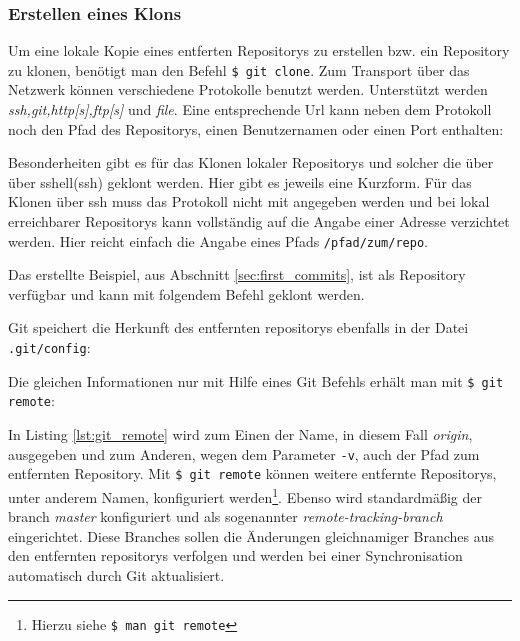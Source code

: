 \subsubsection{Erstellen eines Klons}\label{sec:gitclone}
Um eine lokale Kopie eines entferten Repositorys zu erstellen bzw. ein
Repository zu klonen, benötigt man den Befehl \texttt{\$ git clone}. Zum
Transport über das Netzwerk können verschiedene Protokolle benutzt werden.
Unterstützt werden \textit{ssh,git,http[s],ftp[s]} und \textit{file}. Eine
entsprechende Url kann neben dem Protokoll noch den Pfad des Repositorys, einen
Benutzernamen oder einen Port enthalten:



Besonderheiten gibt es für das Klonen lokaler Repositorys und solcher die über
über \gls{sshell}(\acrshort{ssh}) geklont werden. Hier gibt es jeweils eine
Kurzform. Für das Klonen über \acrshort{ssh} muss das Protokoll nicht mit
angegeben werden und bei lokal erreichbarer Repositorys kann vollständig auf
die Angabe einer Adresse verzichtet werden. Hier reicht einfach die Angabe
eines Pfads \texttt{/pfad/zum/repo}.

Das erstellte Beispiel, aus Abschnitt \ref{sec:first_commits}, ist als
Repository verfügbar und kann mit folgendem Befehl geklont werden.



Git speichert die Herkunft des entfernten \glspl{repository} ebenfalls in der
Datei \texttt{.git/config}:



Die gleichen Informationen nur mit Hilfe eines Git Befehls erhält man mit
\texttt{\$ git remote}:



In Listing \ref{lst:git_remote} wird zum Einen der Name, in diesem Fall
\textit{origin}, ausgegeben und zum Anderen, wegen dem Parameter \texttt{-v},
auch der Pfad zum entfernten Repository. Mit \texttt{\$ git remote} können
weitere entfernte Repositorys, unter anderem Namen, konfiguriert
werden\footnote{Hierzu siehe \texttt{\$ man git remote}}. Ebenso wird
standardmäßig der \gls{branch} \textit{master} konfiguriert und als sogenannter
\textit{remote-tracking-branch} eingerichtet. Diese Branches sollen die
Änderungen gleichnamiger Branches aus den entfernten \glspl{repository}
verfolgen und werden bei einer Synchronisation automatisch durch Git
aktualisiert.\cite[S.~141-143]{gitosp}

